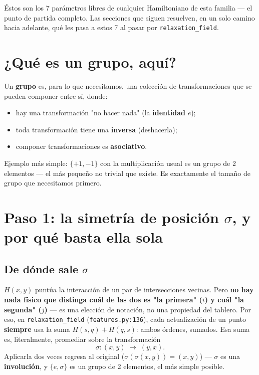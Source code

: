\documentclass[11pt, a4paper]{article}
\begin{document}
\'Estos son los 7 par\'ametros libres de cualquier Hamiltoniano de
esta familia --- el punto de partida completo. Las secciones que
siguen resuelven, en un solo camino hacia adelante, qu\'e les pasa a
estos 7 al pasar por \texttt{relaxation\_field}.

\section{¿Qu\'e es un grupo, aqu\'i?}

Un \textbf{grupo} es, para lo que necesitamos, una colecci\'on de
transformaciones que se pueden componer entre s\'i, donde:
\begin{itemize}
  \item hay una transformaci\'on "no hacer nada" (la \textbf{identidad} $e$);
  \item toda transformaci\'on tiene una \textbf{inversa} (deshacerla);
  \item componer transformaciones es \textbf{asociativo}.
\end{itemize}

Ejemplo m\'as simple: $\{+1,-1\}$ con la multiplicaci\'on usual es un
grupo de 2 elementos --- el m\'as peque\~no no trivial que existe. Es
exactamente el tama\~no de grupo que necesitamos primero.

\section{Paso 1: la simetr\'ia de posici\'on $\sigma$, y por qu\'e basta ella sola}
\label{sec:sigma}

\subsection{De d\'onde sale $\sigma$}

$H(x,y)$ punt\'ua la interacci\'on de un par de intersecciones
vecinas. Pero \textbf{no hay nada f\'isico que distinga cu\'al de las
dos es "la primera" ($i$) y cu\'al "la segunda" ($j$)} --- es una
elecci\'on de notaci\'on, no una propiedad del tablero. Por eso, en
\texttt{relaxation\_field} (\texttt{features.py:136}), cada
actualizaci\'on de un punto \textbf{siempre} usa la suma
$H(s,q)+H(q,s)$: ambos \'ordenes, sumados. Esa suma es, literalmente,
promediar sobre la transformaci\'on
\[
\sigma: (x,y) \;\longmapsto\; (y,x).
\]
Aplicarla dos veces regresa al original ($\sigma(\sigma(x,y))=(x,y)$)
--- $\sigma$ es una \textbf{involuci\'on}, y $\{e,\sigma\}$ es un
grupo de 2 elementos, el m\'as simple posible.
\end{document}
